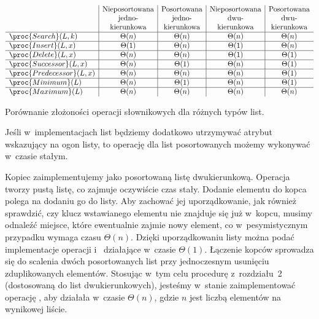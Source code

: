 \begin{table}[ht]
	\begin{center}
		\[
			\begin{array}{l|c|c|c|c}
				& \text{Nieposortowana} & \text{Posortowana} & \text{Nieposortowana} & \text{Posortowana} \\
				& \text{jedno-} & \text{jedno-} & \text{dwu-} & \text{dwu-} \\
				& \text{kierunkowa} & \text{kierunkowa} & \text{kierunkowa} & \text{kierunkowa} \\
				\hline
				\proc{Search}(L,k) & \Theta(n) & \Theta(n) & \Theta(n) & \Theta(n) \\
				\hline
				\proc{Insert}(L,x) & \Theta(1) & \Theta(n) & \Theta(1) & \Theta(n) \\
				\hline
				\proc{Delete}(L,x) & \Theta(n) & \Theta(n) & \Theta(1) & \Theta(1) \\
				\hline
				\proc{Successor}(L,x) & \Theta(n) & \Theta(1) & \Theta(n) & \Theta(1) \\
				\hline
				\proc{Predecessor}(L,x) & \Theta(n) & \Theta(n) & \Theta(n) & \Theta(1) \\
				\hline
				\proc{Minimum}(L) & \Theta(n) & \Theta(1) & \Theta(n) & \Theta(1) \\
				\hline
				\proc{Maximum}(L) & \Theta(n) & \Theta(n) & \Theta(n) & \Theta(n)
			\end{array}
		\]
	\end{center}
	\caption{Porównanie złożoności operacji słownikowych dla różnych typów list.} \label{tab:10-1}
\end{table}
Jeśli w~implementacjach list będziemy dodatkowo utrzymywać atrybut  wskazujący na ogon listy, to operację  dla list posortowanych możemy wykonywać w~czasie stałym.


\subproblem %
Kopiec zaimplementujemy jako posortowaną listę dwukierunkową. Operacja  tworzy pustą listę, co zajmuje oczywiście czas stały. Dodanie elementu do kopca polega na dodaniu go do listy. Aby zachować jej uporządkowanie, jak również sprawdzić, czy klucz wstawianego elementu nie znajduje się już w~kopcu, musimy odnaleźć miejsce, które ewentualnie zajmie nowy element, co w~pesymistycznym przypadku wymaga czasu $\Theta(n)$. Dzięki uporządkowaniu listy można podać implementacje operacji  i~ działające w~czasie $\Theta(1)$. Łączenie kopców sprowadza się do scalenia dwóch posortowanych list przy jednoczesnym usunięciu zduplikowanych elementów. Stosując w~tym celu procedurę  z~rozdziału~2 (dostosowaną do list dwukierunkowych), jesteśmy w~stanie zaimplementować operację , aby działała w~czasie $\Theta(n)$, gdzie $n$ jest liczbą elementów na wynikowej liście.


